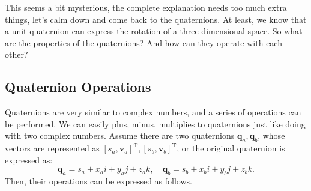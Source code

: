 This seems a bit mysterious, the complete explanation needs too much extra things, let's calm down and come back to the quaternions. At least, we know that a unit quaternion can express the rotation of a three-dimensional space. So what are the properties of the quaternions? And how can they operate with each other?

\subsection{Quaternion Operations}

Quaternions are very similar to complex numbers, and a series of operations can be performed. We can easily plus, minus, multiplies to quaternions just like doing with two complex numbers. Assume there are two quaternions $ \mathbf{q}_a, \mathbf{q}_b $, whose vectors are represented as $ [s_a, \mathbf {v}_a]^ \mathrm {T}, [s_b, \mathbf{v}_b]^ \mathrm {T} $, or the original quaternion is expressed as:
\[
\mathbf{q} _a = s_a + x_ai + y_aj + z_ak, \quad  \mathbf {q} _b = s_b + x_bi + y_bj + z_bk.
\]
Then, their operations can be expressed as follows.

